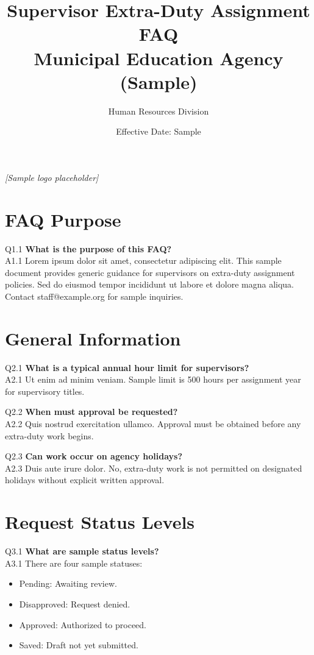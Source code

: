 \documentclass[11pt,a4paper,oneside]{article}
\title{Supervisor Extra-Duty Assignment FAQ\\Municipal Education Agency (Sample)}
\author{Human Resources Division}
\date{Effective Date: Sample}
\begin{document}
\maketitle

\begin{center}
  \vspace{6pt}
  \textit{[Sample logo placeholder]}
\end{center}

\newpage
\tableofcontents
\newpage

\section{FAQ Purpose}
\noindent Q1.1 \textbf{What is the purpose of this FAQ?}\\
\noindent A1.1 Lorem ipsum dolor sit amet, consectetur adipiscing elit. This sample document provides generic guidance for supervisors on extra-duty assignment policies. Sed do eiusmod tempor incididunt ut labore et dolore magna aliqua. Contact staff@example.org for sample inquiries.\vspace{6pt}

\section{General Information}
\noindent Q2.1 \textbf{What is a typical annual hour limit for supervisors?}\\
\noindent A2.1 Ut enim ad minim veniam. Sample limit is 500 hours per assignment year for supervisory titles.\vspace{6pt}

\noindent Q2.2 \textbf{When must approval be requested?}\\
\noindent A2.2 Quis nostrud exercitation ullamco. Approval must be obtained before any extra-duty work begins.\vspace{6pt}

\noindent Q2.3 \textbf{Can work occur on agency holidays?}\\
\noindent A2.3 Duis aute irure dolor. No, extra-duty work is not permitted on designated holidays without explicit written approval.\vspace{6pt}

\section{Request Status Levels}
\noindent Q3.1 \textbf{What are sample status levels?}\\
\noindent A3.1 There are four sample statuses:
\begin{itemize}
\item Pending: Awaiting review.
\item Disapproved: Request denied.
\item Approved: Authorized to proceed.
\item Saved: Draft not yet submitted.
\end{itemize}\vspace{6pt}
\end{document}
